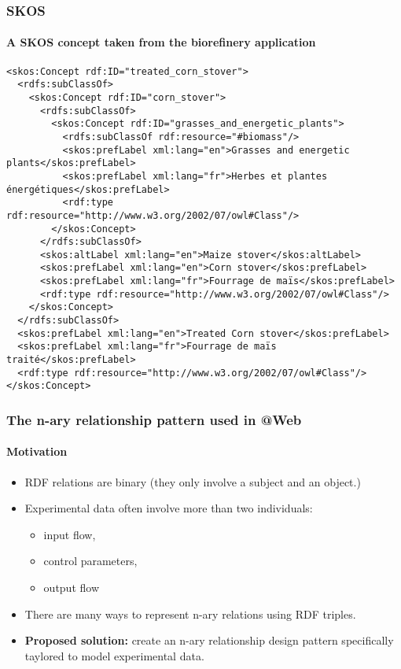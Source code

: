 \documentclass{beamer}
\makeatletter
\newcommand{\atweb}{\textbf{@Web}\xspace}
\makeatother
\begin{document}
\begin{frame}[fragile]
  \frametitle{SKOS}
  \framesubtitle{A SKOS concept taken from the biorefinery application}

  \begin{Verbatim}[fontsize=\scriptsize]
<skos:Concept rdf:ID="treated_corn_stover">
  <rdfs:subClassOf>
    <skos:Concept rdf:ID="corn_stover">
      <rdfs:subClassOf>
        <skos:Concept rdf:ID="grasses_and_energetic_plants">
          <rdfs:subClassOf rdf:resource="#biomass"/>
          <skos:prefLabel xml:lang="en">Grasses and energetic plants</skos:prefLabel>
          <skos:prefLabel xml:lang="fr">Herbes et plantes énergétiques</skos:prefLabel>
          <rdf:type rdf:resource="http://www.w3.org/2002/07/owl#Class"/>
        </skos:Concept>
      </rdfs:subClassOf>
      <skos:altLabel xml:lang="en">Maize stover</skos:altLabel>
      <skos:prefLabel xml:lang="en">Corn stover</skos:prefLabel>
      <skos:prefLabel xml:lang="fr">Fourrage de maïs</skos:prefLabel>
      <rdf:type rdf:resource="http://www.w3.org/2002/07/owl#Class"/>
    </skos:Concept>
  </rdfs:subClassOf>
  <skos:prefLabel xml:lang="en">Treated Corn stover</skos:prefLabel>
  <skos:prefLabel xml:lang="fr">Fourrage de maïs traité</skos:prefLabel>
  <rdf:type rdf:resource="http://www.w3.org/2002/07/owl#Class"/>
</skos:Concept>
  \end{Verbatim}
\end{frame}

\begin{frame}
  \frametitle{The n-ary relationship pattern used in \atweb}
  \framesubtitle{Motivation}

  \begin{itemize}
    \item RDF relations are binary (they only involve a subject and an object.)

    \pause

    \item Experimental data often involve more than two individuals:

    \pause

    \begin{itemize}
      \item input flow,
      \item control parameters,
      \item output flow
    \end{itemize}

    \pause

    \item There are many ways to represent n-ary relations using RDF triples.

    \pause

    \item \textbf{Proposed solution:} create an n-ary relationship design
      pattern specifically taylored to model experimental data.
  \end{itemize}
\end{frame}
\end{document}

